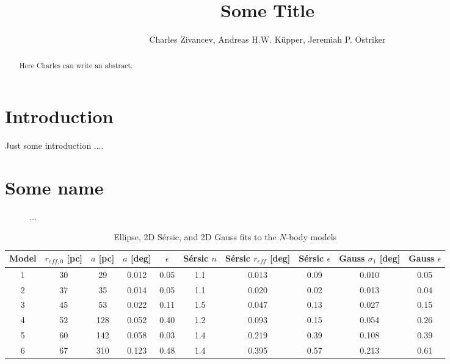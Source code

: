 \documentclass[english, apj]{emulateapj}
\begin{document}
\title{Some Title}


\author{Charles Zivancev, Andreas H.W. K\"upper, Jeremiah P. Ostriker }




\begin{abstract}
Here Charles can write an abstract.
\end{abstract}






\section{Introduction}\label{sec:introduction}
Just some introduction
....



\section{Some name}\label{sec:somename}

\begin{figure}
\centering
\caption{...}
\label{halflight}
\end{figure}


\begin{table*}
 \centering
 \label{tab:profiles}
 \caption{Ellipse, 2D S\'ersic, and 2D Gauss fits to the $N$-body models}
 \begin{tabular}{cc|ccc|ccc|cc}
 Model & $r_{eff,0}$ [pc] & $a$ [pc] &  $a$ [deg] & $\epsilon$ & S\'ersic $n$ & S\'ersic $r_{eff}$ [deg] & S\'ersic $\epsilon$ & Gauss $\sigma_1$ [deg] & Gauss $\epsilon$\\
 \hline
1 & 30 & 29 & 0.012 & 0.05 & 1.1 & 0.013 & 0.09 & 0.010  & 0.05 \\
2 & 37 & 35 & 0.014 & 0.05 & 1.1 & 0.020 & 0.02 & 0.013  & 0.04 \\
3 & 45 & 53 & 0.022 & 0.11 & 1.5 & 0.047 & 0.13 & 0.027  & 0.15 \\
4 & 52 & 128 & 0.052 & 0.40 & 1.2 & 0.093 & 0.15 & 0.054  & 0.26 \\
5 & 60 & 142 & 0.058 & 0.03 & 1.4 & 0.219 & 0.39 & 0.108  & 0.39 \\
6 & 67 & 310 & 0.123 & 0.48 & 1.4 & 0.395 & 0.57 & 0.213  & 0.61 \\
\end{tabular}
\end{table*}
\end{document}
